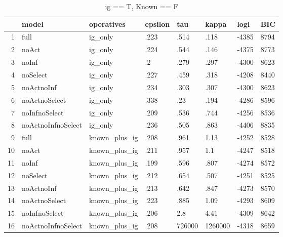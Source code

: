 \begin{table}[ht]
\centering
\begin{tabular}{rlllllll}
  \hline
 & model & operatives & epsilon & tau & kappa & logl & BIC \\ 
  \hline
1 & full & ig\_only & .223 & .514 & .118 & -4385 & 8794 \\ 
  2 & noAct & ig\_only & .224 & .544 & .146 & -4375 & 8773 \\ 
  3 & noInf & ig\_only & .2 & .279 & .297 & -4300 & 8623 \\ 
  4 & noSelect & ig\_only & .227 & .459 & .318 & -4208 & 8440 \\ 
  5 & noActnoInf & ig\_only & .234 & .303 & .307 & -4300 & 8623 \\ 
  6 & noActnoSelect & ig\_only & .338 & .23 & .194 & -4286 & 8596 \\ 
  7 & noInfnoSelect & ig\_only & .209 & .536 & .744 & -4256 & 8536 \\ 
  8 & noActnoInfnoSelect & ig\_only & .236 & .505 & .863 & -4406 & 8835 \\ 
  9 & full & known\_plus\_ig & .208 & .961 & 1.13 & -4252 & 8528 \\ 
  10 & noAct & known\_plus\_ig & .211 & .957 & 1.1 & -4247 & 8518 \\ 
  11 & noInf & known\_plus\_ig & .199 & .596 & .807 & -4274 & 8572 \\ 
  12 & noSelect & known\_plus\_ig & .212 & .654 & .507 & -4251 & 8525 \\ 
  13 & noActnoInf & known\_plus\_ig & .213 & .642 & .847 & -4273 & 8570 \\ 
  14 & noActnoSelect & known\_plus\_ig & .223 & .885 & 1.09 & -4293 & 8609 \\ 
  15 & noInfnoSelect & known\_plus\_ig & .206 & 2.8 & 4.41 & -4309 & 8642 \\ 
  16 & noActnoInfnoSelect & known\_plus\_ig & .208 & 726000 & 1260000 & -4318 & 8659 \\ 
   \hline
\end{tabular}
\caption{ig == T, Known == F} 
\end{table}
